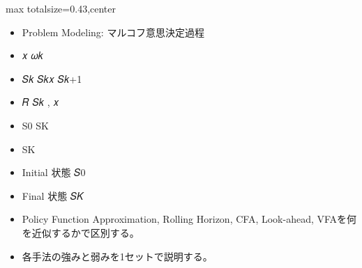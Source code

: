 \clearpage
{}
\begin{minipage}[t]{0.405\textwidth}
\begin{adjustbox}{max totalsize={\textwidth}{0.43\textheight},center}
\begin{minipage}{\textwidth}\scriptsize
{}\begin{itemize}
\item Problem Modeling: マルコフ意思決定過程
\item 𝑥 𝜔𝑘
\item 𝑆𝑘 𝑆𝑘𝑥 𝑆𝑘+1
\item 𝑅 𝑆𝑘 , 𝑥
\item S0 SK
\item SK
\item Initial 状態 𝑆0
\item Final 状態 𝑆𝐾
\end{itemize}\begin{itemize}
\item Policy Function Approximation, Rolling Horizon, CFA, Look-ahead, VFAを何を近似するかで区別する。
\item 各手法の強みと弱みを1セットで説明する。
\end{itemize}
\end{minipage}
\end{adjustbox}
\end{minipage}\hfill
